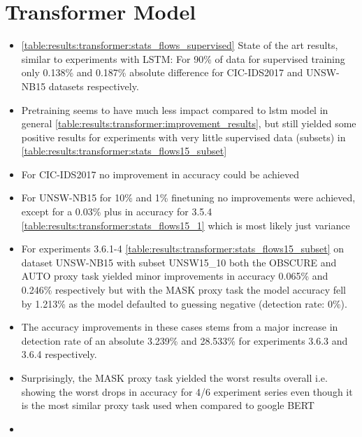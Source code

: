 \section{Transformer Model} \label{sec:results:transformer}









\begin{itemize}
	\item \ref{table:results:transformer:stats_flows_supervised} State of the art results, similar to experiments with LSTM: For 90\% of data for supervised training only 0.138\% and 0.187\% absolute difference for CIC-IDS2017 and UNSW-NB15 datasets respectively.
	\item Pretraining seems to have much less impact compared to \gls{lstm} model in general \ref{table:results:transformer:improvement_results}, but still yielded some positive results for experiments with very little supervised data (subsets) in \ref{table:results:transformer:stats_flows15_subset}
	\item For CIC-IDS2017 no improvement in accuracy could be achieved
	\item For UNSW-NB15 for 10\% and 1\% finetuning no improvements were achieved, except for a 0.03\% plus in accuracy for 3.5.4 \ref{table:results:transformer:stats_flows15_1} which is most likely just variance
	\item For experiments 3.6.1-4 \ref{table:results:transformer:stats_flows15_subset} on dataset UNSW-NB15 with subset UNSW15\_10 both the OBSCURE and AUTO proxy task yielded minor improvements in accuracy 0.065\% and 0.246\% respectively but with the MASK proxy task the model accuracy fell by 1.213\% as the model defaulted to guessing negative (detection rate: 0\%).
	\item The accuracy improvements in these cases stems from a major increase in detection rate of an absolute 3.239\% and 28.533\% for experiments 3.6.3 and 3.6.4 respectively.
	\item Surprisingly, the MASK proxy task yielded the worst results overall i.e. showing the worst drops in accuracy for 4/6 experiment series even though it is the most similar proxy task used when compared to google BERT
	\item 
\end{itemize}

